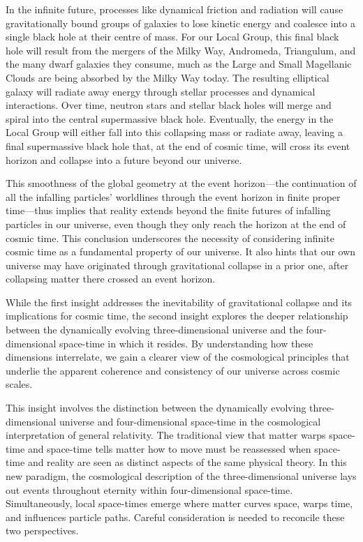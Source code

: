 \documentclass[aps,rmp,groupedaddress,twocolumn,10pt]{revtex4-2}
\begin{document}
In the infinite future, processes like dynamical friction and radiation will cause gravitationally bound groups of galaxies to lose kinetic energy and coalesce into a single black hole at their centre of mass. For our Local Group, this final black hole will result from the mergers of the Milky Way, Andromeda, Triangulum, and the many dwarf galaxies they consume, much as the Large and Small Magellanic Clouds are being absorbed by the Milky Way today. The resulting elliptical galaxy will radiate away energy through stellar processes and dynamical interactions. Over time, neutron stars and stellar black holes will merge and spiral into the central supermassive black hole. Eventually, the energy in the Local Group will either fall into this collapsing mass or radiate away, leaving a final supermassive black hole that, at the end of cosmic time, will cross its event horizon and collapse into a future beyond our universe. 

This smoothness of the global geometry at the event horizon---the continuation of all the infalling particles' worldlines through the event horizon in finite proper time---thus implies that reality extends beyond the finite futures of infalling particles in our universe, even though they only reach the horizon at the end of cosmic time. This conclusion underscores the necessity of considering infinite cosmic time as a fundamental property of our universe. It also hints that our own universe may have originated through gravitational collapse in a prior one, after collapsing matter there crossed an event horizon.

While the first insight addresses the inevitability of gravitational collapse and its implications for cosmic time, the second insight explores the deeper relationship between the dynamically evolving three-dimensional universe and the four-dimensional space-time in which it resides. By understanding how these dimensions interrelate, we gain a clearer view of the cosmological principles that underlie the apparent coherence and consistency of our universe across cosmic scales.

This insight involves the distinction between the dynamically evolving three-dimensional universe and four-dimensional space-time in the cosmological interpretation of general relativity. The traditional view that matter warps space-time and space-time tells matter how to move must be reassessed when space-time and reality are seen as distinct aspects of the same physical theory. In this new paradigm, the cosmological description of the three-dimensional universe lays out events throughout eternity within four-dimensional space-time. Simultaneously, local space-times emerge where matter curves space, warps time, and influences particle paths. Careful consideration is needed to reconcile these two perspectives.
\end{document}
